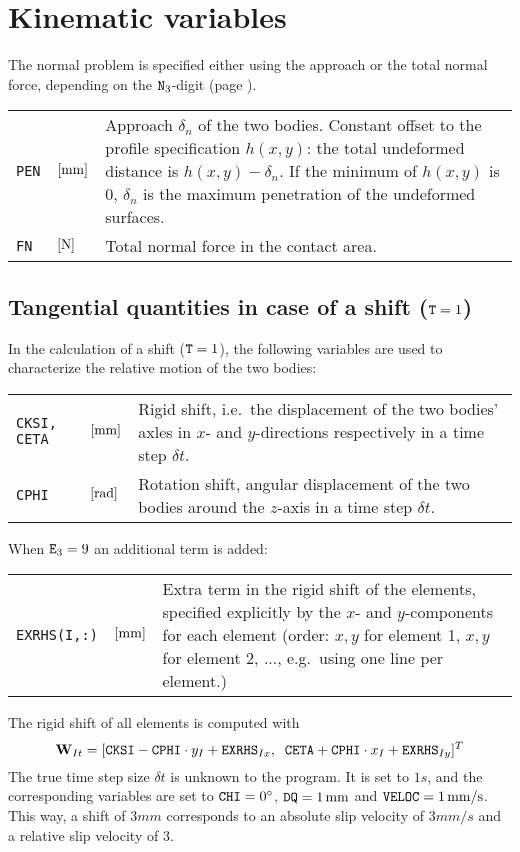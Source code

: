 \documentclass[12pt]{report}
\newenvironment{inputvars}{\vspace{0.4\baselineskip}%

\begin{tabular}{>{\raggedright}p{22mm}p{19mm}p{113mm}}}{
\end{tabular}

}
\newcommand{\inpvar}[3]{{\small\tt #1} & $#2$ & #3 \\[1ex]}
\begin{document}
\section{Kinematic variables}
\label{sec:kincns}

The normal problem is specified either using the approach or the total
normal force, depending on the ${\tt N}_3$-digit (page \pageref{n3-digit}).
\begin{inputvars}
\inpvar{PEN}{\bunit{mm}}{Approach $\delta_n$ of the two bodies. Constant offset to
        the profile specification $h(x,y)$: the total undeformed distance
        is $h(x,y)-\delta_n$. If the minimum of $h(x,y)$ is 0, $\delta_n$ is
        the maximum penetration of the undeformed surfaces.}
\inpvar{FN}{\bunit{N}}{Total normal force in the contact area.}
\end{inputvars}

\subsection{\texorpdfstring{Tangential quantities in case of a shift 
        (${\tt T}=1$)}{}}
\label{sec:kincns_shift}

In the calculation of a shift (${\tt T}=1$), the following variables are used
to characterize the relative motion of the two bodies:
\begin{inputvars}
\inpvar{CKSI, CETA}{\bunit{mm}}{Rigid shift, i.e.\ the displacement of the two
        bodies' axles in $x$- and $y$-directions respectively in a time
        step $\delta t$.}
\inpvar{CPHI}{\bunit{rad}}{Rotation shift, angular displacement of the two bodies
        around the $z$-axis in a time step $\delta t$.}
\end{inputvars}
When ${\tt E}_3=9$ an additional term is added:
\begin{inputvars}
\inpvar{EXRHS(I,:)}{\bunit{mm}}{Extra term in the rigid shift of the elements,
        specified explicitly by the $x$- and $y$-components for each
        element (order: $x,y$ for element 1, $x,y$ for element 2, ...,
        e.g.\ using one line per element.)}
\end{inputvars}
The rigid shift of all elements is computed with
\begin{equation}
    \vec{W}_{It} = [{\tt CKSI} - {\tt CPHI} \cdot y_I + {\tt EXRHS}_{Ix},  \;\;
     {\tt CETA} + {\tt CPHI} \cdot x_I + {\tt EXRHS}_{Iy}  ]^T
\end{equation}
The true time step size $\delta t$ is unknown to the program. It is set to
$1\unit{s}$, and the corresponding variables are set to ${\tt CHI}=0^\circ$,
${\tt DQ}=1\unit{mm}$ and ${\tt VELOC}=1\unit{mm/s}$. This way, a shift of
$3\unit{mm}$
corresponds to an absolute slip velocity of $3\unit{mm/s}$ and a relative
slip velocity of $3$.
\end{document}
